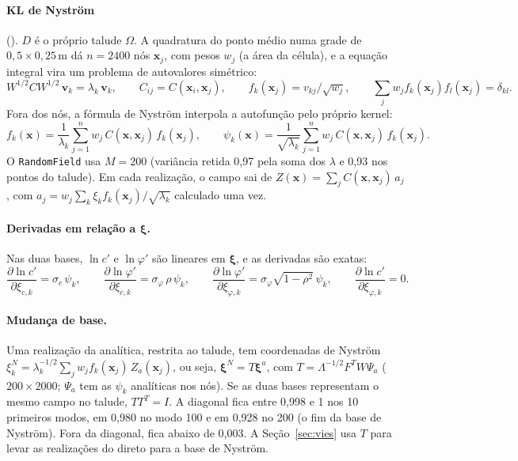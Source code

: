 \documentclass[11pt,a4paper]{article}
\begin{document}
\paragraph{KL de Nyström} (). $D$ é o próprio talude $\Omega$. A quadratura do
ponto médio numa grade de $0{,}5\times0{,}25$\,m dá $n = 2400$ nós $\bm x_j$, com pesos $w_j$ (a área da célula), e a
equação integral vira um problema de autovalores simétrico:
\begin{equation*}
  W^{1/2} C W^{1/2}\,\bm v_k = \lambda_k\,\bm v_k, \qquad C_{ij} = C(\bm x_i, \bm x_j), \qquad
  f_k(\bm x_j) = v_{kj}/\sqrt{w_j}, \qquad \textstyle\sum_j w_j f_k(\bm x_j) f_l(\bm x_j) = \delta_{kl}.
\end{equation*}
Fora dos nós, a fórmula de Nyström interpola a autofunção pelo próprio kernel:
\begin{equation}
  f_k(\bm x) = \frac{1}{\lambda_k}\sum_{j=1}^{n} w_j\, C(\bm x, \bm x_j)\, f_k(\bm x_j), \qquad
  \psi_k(\bm x) = \frac{1}{\sqrt{\lambda_k}}\sum_{j=1}^{n} w_j\, C(\bm x, \bm x_j)\, f_k(\bm x_j).
  \label{eq:nystrom}
\end{equation}
O \texttt{RandomField} usa $M = 200$ (variância retida 0,97 pela soma dos $\lambda$ e 0,93 nos pontos do talude). Em cada
realização, o campo sai de $Z(\bm x) = \sum_j C(\bm x, \bm x_j)\, a_j$, com
$a_j = w_j \sum_k \xi_k f_k(\bm x_j)/\sqrt{\lambda_k}$ calculado uma vez.

\paragraph{Derivadas em relação a $\bm\xi$.} Nas duas bases, $\ln c'$ e $\ln\varphi'$ são lineares em $\bm\xi$, e as
derivadas são exatas:
\begin{equation}
  \frac{\partial \ln c'}{\partial \xi_{c,k}} = \sigma_c\,\psi_k, \qquad
  \frac{\partial \ln\varphi'}{\partial \xi_{c,k}} = \sigma_\varphi\,\rho\,\psi_k, \qquad
  \frac{\partial \ln\varphi'}{\partial \xi_{\varphi,k}} = \sigma_\varphi\sqrt{1 - \rho^2}\,\psi_k, \qquad
  \frac{\partial \ln c'}{\partial \xi_{\varphi,k}} = 0.
  \label{eq:dlnxi}
\end{equation}

\paragraph{Mudança de base.} Uma realização da analítica, restrita ao talude, tem coordenadas de Nyström
$\xi^N_k = \lambda_k^{-1/2}\sum_j w_j f_k(\bm x_j)\, Z_a(\bm x_j)$, ou seja, $\bm\xi^N = T\bm\xi^a$, com
$T = \Lambda^{-1/2} F^{T} W \Psi_a$ ($200\times2000$; $\Psi_a$ tem as $\psi_k$ analíticas nos nós). Se as duas bases
representam o mesmo campo no talude, $TT^T = I$. A diagonal fica entre 0{,}998 e 1 nos 10
primeiros modos, em 0{,}980 no modo 100 e em 0{,}928 no 200 (o fim
da base de Nyström). Fora da diagonal, fica abaixo de 0{,}003. A Seção~\ref{sec:vies}
usa $T$ para levar as realizações do direto para a base de Nyström.
\end{document}
